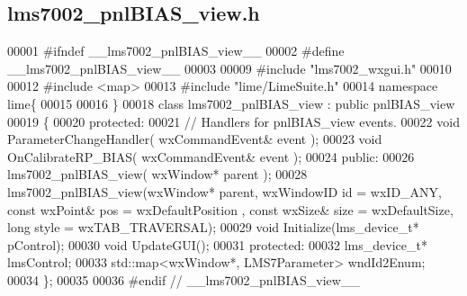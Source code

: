 \subsection{lms7002\+\_\+pnl\+B\+I\+A\+S\+\_\+view.\+h}
\label{lms7002__pnlBIAS__view_8h_source}

\begin{DoxyCode}
00001 \textcolor{preprocessor}{#ifndef \_\_lms7002\_pnlBIAS\_view\_\_}
00002 \textcolor{preprocessor}{#define \_\_lms7002\_pnlBIAS\_view\_\_}
00003 
00009 \textcolor{preprocessor}{#include "lms7002_wxgui.h"}
00010 
00012 \textcolor{preprocessor}{#include <map>}
00013 \textcolor{preprocessor}{#include "lime/LimeSuite.h"}
00014 \textcolor{keyword}{namespace }lime\{
00015 
00016 \}
00018 \textcolor{keyword}{class }lms7002_pnlBIAS_view : \textcolor{keyword}{public} pnlBIAS_view
00019 \{
00020     \textcolor{keyword}{protected}:
00021         \textcolor{comment}{// Handlers for pnlBIAS\_view events.}
00022         \textcolor{keywordtype}{void} ParameterChangeHandler( wxCommandEvent& event );
00023         \textcolor{keywordtype}{void} OnCalibrateRP\_BIAS( wxCommandEvent& event );
00024     \textcolor{keyword}{public}:
00026         lms7002_pnlBIAS_view( wxWindow* parent );
00028     lms7002_pnlBIAS_view(wxWindow* parent, wxWindowID \textcolor{keywordtype}{id} = wxID\_ANY, \textcolor{keyword}{const} wxPoint& pos = wxDefaultPosition
      , \textcolor{keyword}{const} wxSize& size = wxDefaultSize, \textcolor{keywordtype}{long} style = wxTAB\_TRAVERSAL);
00029     \textcolor{keywordtype}{void} Initialize(lms_device_t* pControl);
00030     \textcolor{keywordtype}{void} UpdateGUI();
00031 \textcolor{keyword}{protected}:
00032     lms_device_t* lmsControl;
00033     std::map<wxWindow*, LMS7Parameter> wndId2Enum;
00034 \};
00035 
00036 \textcolor{preprocessor}{#endif // \_\_lms7002\_pnlBIAS\_view\_\_}
\end{DoxyCode}
